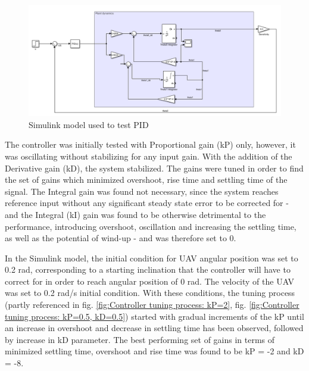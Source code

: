 \begin{figure}[H]
    \centering
    \includegraphics[scale=0.6]{graphics/Control/Simulink.png}
    \caption{Simulink model used to test PID}
     \label{Simulink Model Used to Test PID control}
\end{figure} 

The controller was initially tested with Proportional gain (kP) only, however, it was oscillating without stabilizing for any input gain. With the addition of the Derivative gain (kD), the system stabilized. The gains were tuned in order to find the set of gains which minimized overshoot, rise time and settling time of the signal. The Integral gain was found not necessary, since the system reaches reference input without any significant steady state error to be corrected for - and the Integral (kI) gain was found to be otherwise detrimental to the performance, introducing overshoot, oscillation and increasing the settling time, as well as the potential of wind-up - and was therefore set to 0. 

In the Simulink model, the initial condition for UAV angular position was set to 0.2 rad, corresponding to a starting inclination that the controller will have to correct for in order to reach angular position of 0 rad. The velocity of the UAV was set to 0.2 rad/s initial condition. With these conditions, the tuning process (partly referenced in fig. \ref{fig:Controller tuning process: kP=2}, fig. \ref{fig:Controller tuning process: kP=0.5, kD=0.5})
started with gradual increments of the kP until an increase in overshoot and decrease in settling time has been observed, followed by increase in kD parameter. The best performing set of gains in terms of minimized settling time, overshoot and rise time was found to be kP = -2 and kD = -8.  

